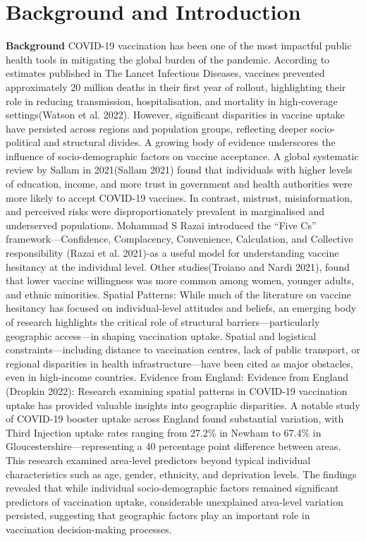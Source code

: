 \documentclass{article}
\begin{document}

\section{Background and Introduction}\label{background-and-introduction}

\textbf{Background} COVID-19 vaccination has been one of the most
impactful public health tools in mitigating the global burden of the
pandemic. According to estimates published in The Lancet Infectious
Diseases, vaccines prevented approximately 20 million deaths in their
first year of rollout, highlighting their role in reducing transmission,
hospitalisation, and mortality in high-coverage settings(Watson et al.
2022). However, significant disparities in vaccine uptake have persisted
across regions and population groups, reflecting deeper socio-political
and structural divides. A growing body of evidence underscores the
influence of socio-demographic factors on vaccine acceptance. A global
systematic review by Sallam in 2021(Sallam 2021) found that individuals
with higher levels of education, income, and more trust in government
and health authorities were more likely to accept COVID-19 vaccines. In
contrast, mistrust, misinformation, and perceived risks were
disproportionately prevalent in marginalised and underserved
populations. Mohammad S Razai introduced the ``Five Cs''
framework---Confidence, Complacency, Convenience, Calculation, and
Collective responsibility (Razai et al. 2021)-as a useful model for
understanding vaccine hesitancy at the individual level. Other
studies(Troiano and Nardi 2021), found that lower vaccine willingness
was more common among women, younger adults, and ethnic minorities.
Spatial Patterns: While much of the literature on vaccine hesitancy has
focused on individual-level attitudes and beliefs, an emerging body of
research highlights the critical role of structural
barriers---particularly geographic access---in shaping vaccination
uptake. Spatial and logistical constraints---including distance to
vaccination centres, lack of public transport, or regional disparities
in health infrastructure---have been cited as major obstacles, even in
high-income countries. Evidence from England: Evidence from England
(Dropkin 2022): Research examining spatial patterns in COVID-19
vaccination uptake has provided valuable insights into geographic
disparities. A notable study of COVID-19 booster uptake across England
found substantial variation, with Third Injection uptake rates ranging
from 27.2\% in Newham to 67.4\% in Gloucestershire---representing a 40
percentage point difference between areas. This research examined
area-level predictors beyond typical individual characteristics such as
age, gender, ethnicity, and deprivation levels. The findings revealed
that while individual socio-demographic factors remained significant
predictors of vaccination uptake, considerable unexplained area-level
variation persisted, suggesting that geographic factors play an
important role in vaccination decision-making processes.
\end{document}
